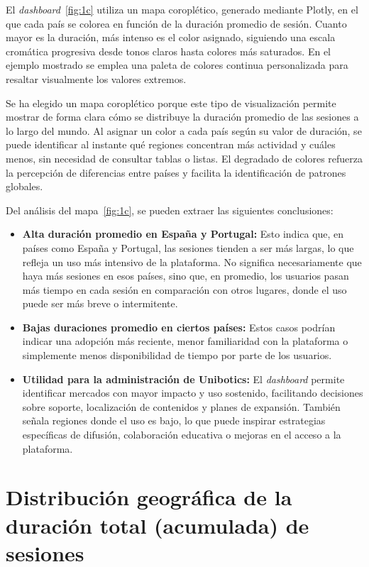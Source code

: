 \documentclass[a4paper, 12pt]{book}
\begin{document}
El \textit{dashboard}~\ref{fig:1c} utiliza un mapa coroplético, generado mediante Plotly, en el que cada país se colorea en función de la duración promedio de sesión. Cuanto mayor es la duración, más intenso es el color asignado, siguiendo una escala cromática progresiva desde tonos claros hasta colores más saturados. En el ejemplo mostrado se emplea una paleta de colores continua personalizada para resaltar visualmente los valores extremos.


Se ha elegido un mapa coroplético porque este tipo de visualización permite mostrar de forma clara cómo se distribuye la duración promedio de las sesiones a lo largo del mundo. Al asignar un color a cada país según su valor de duración, se puede identificar al instante qué regiones concentran más actividad y cuáles menos, sin necesidad de consultar tablas o listas. El degradado de colores refuerza la percepción de diferencias entre países y facilita la identificación de patrones globales.

Del análisis del mapa~\ref{fig:1c}, se pueden extraer las siguientes conclusiones:

\begin{itemize}
  \item \textbf{Alta duración promedio en España y Portugal:} Esto indica que, en países como España y Portugal, las sesiones tienden a ser más largas, lo que refleja un uso más intensivo de la plataforma. No significa necesariamente que haya más sesiones en esos países, sino que, en promedio, los usuarios pasan más tiempo en cada sesión en comparación con otros lugares, donde el uso puede ser más breve o intermitente.

  \item \textbf{Bajas duraciones promedio en ciertos países:} Estos casos podrían indicar una adopción más reciente, menor familiaridad con la plataforma o simplemente menos disponibilidad de tiempo por parte de los usuarios.

  \item \textbf{Utilidad para la administración de Unibotics:} El \textit{dashboard} permite identificar mercados con mayor impacto y uso sostenido, facilitando decisiones sobre soporte, localización de contenidos y planes de expansión. También señala regiones donde el uso es bajo, lo que puede inspirar estrategias específicas de difusión, colaboración educativa o mejoras en el acceso a la plataforma.
\end{itemize}

\section{Distribución geográfica de la duración total (acumulada) de sesiones}
\label{sec:dash2a}
\end{document}
